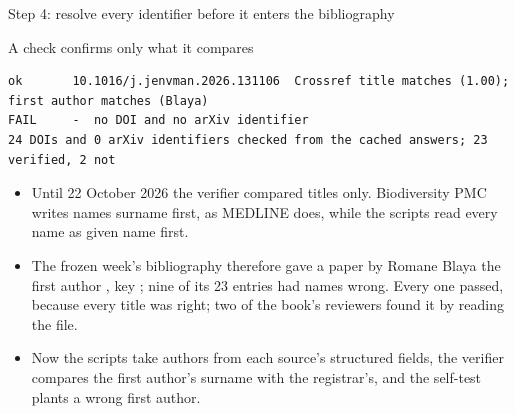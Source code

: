 \documentclass[11pt,aspectratio=169]{beamer}
\begin{document}
\begin{frame}{Step 4: resolve every identifier before it enters the bibliography}
\end{frame}

\begin{frame}[fragile]{A check confirms only what it compares}
  \begin{lstlisting}[basicstyle=\ttfamily\scriptsize]
ok       10.1016/j.jenvman.2026.131106  Crossref title matches (1.00); first author matches (Blaya)
FAIL     -  no DOI and no arXiv identifier
24 DOIs and 0 arXiv identifiers checked from the cached answers; 23 verified, 2 not
  \end{lstlisting}
  \small
  \begin{itemize}
    \item Until 22 October 2026 the verifier compared titles only. Biodiversity PMC writes names surname first, as MEDLINE does, while the scripts read every name as given name first.
    \item The frozen week's bibliography therefore gave a paper by Romane Blaya the first author , key ; nine of its 23 entries had names wrong. Every one passed, because every title was right; two of the book's reviewers found it by reading the file.
    \item Now the scripts take authors from each source's structured fields, the verifier compares the first author's surname with the registrar's, and the self-test plants a wrong first author.
  \end{itemize}
\end{frame}
\end{document}
